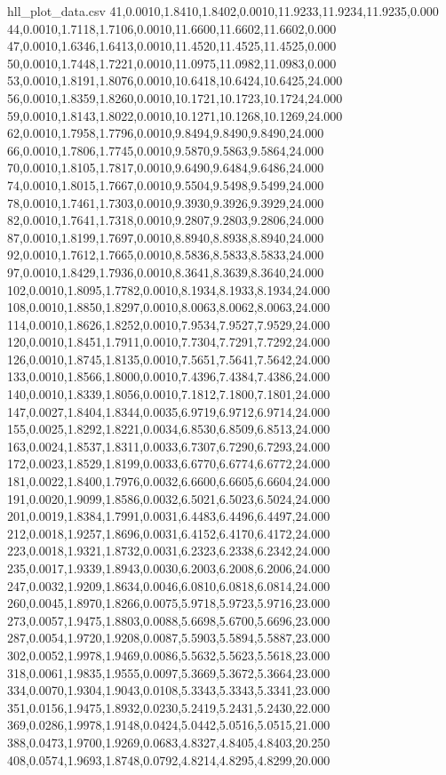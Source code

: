 \documentclass[11pt,letterpaper]{article}
\begin{document}
\begin{filecontents*}{hll_plot_data.csv}
41,0.0010,1.8410,1.8402,0.0010,11.9233,11.9234,11.9235,0.000
44,0.0010,1.7118,1.7106,0.0010,11.6600,11.6602,11.6602,0.000
47,0.0010,1.6346,1.6413,0.0010,11.4520,11.4525,11.4525,0.000
50,0.0010,1.7448,1.7221,0.0010,11.0975,11.0982,11.0983,0.000
53,0.0010,1.8191,1.8076,0.0010,10.6418,10.6424,10.6425,24.000
56,0.0010,1.8359,1.8260,0.0010,10.1721,10.1723,10.1724,24.000
59,0.0010,1.8143,1.8022,0.0010,10.1271,10.1268,10.1269,24.000
62,0.0010,1.7958,1.7796,0.0010,9.8494,9.8490,9.8490,24.000
66,0.0010,1.7806,1.7745,0.0010,9.5870,9.5863,9.5864,24.000
70,0.0010,1.8105,1.7817,0.0010,9.6490,9.6484,9.6486,24.000
74,0.0010,1.8015,1.7667,0.0010,9.5504,9.5498,9.5499,24.000
78,0.0010,1.7461,1.7303,0.0010,9.3930,9.3926,9.3929,24.000
82,0.0010,1.7641,1.7318,0.0010,9.2807,9.2803,9.2806,24.000
87,0.0010,1.8199,1.7697,0.0010,8.8940,8.8938,8.8940,24.000
92,0.0010,1.7612,1.7665,0.0010,8.5836,8.5833,8.5833,24.000
97,0.0010,1.8429,1.7936,0.0010,8.3641,8.3639,8.3640,24.000
102,0.0010,1.8095,1.7782,0.0010,8.1934,8.1933,8.1934,24.000
108,0.0010,1.8850,1.8297,0.0010,8.0063,8.0062,8.0063,24.000
114,0.0010,1.8626,1.8252,0.0010,7.9534,7.9527,7.9529,24.000
120,0.0010,1.8451,1.7911,0.0010,7.7304,7.7291,7.7292,24.000
126,0.0010,1.8745,1.8135,0.0010,7.5651,7.5641,7.5642,24.000
133,0.0010,1.8566,1.8000,0.0010,7.4396,7.4384,7.4386,24.000
140,0.0010,1.8339,1.8056,0.0010,7.1812,7.1800,7.1801,24.000
147,0.0027,1.8404,1.8344,0.0035,6.9719,6.9712,6.9714,24.000
155,0.0025,1.8292,1.8221,0.0034,6.8530,6.8509,6.8513,24.000
163,0.0024,1.8537,1.8311,0.0033,6.7307,6.7290,6.7293,24.000
172,0.0023,1.8529,1.8199,0.0033,6.6770,6.6774,6.6772,24.000
181,0.0022,1.8400,1.7976,0.0032,6.6600,6.6605,6.6604,24.000
191,0.0020,1.9099,1.8586,0.0032,6.5021,6.5023,6.5024,24.000
201,0.0019,1.8384,1.7991,0.0031,6.4483,6.4496,6.4497,24.000
212,0.0018,1.9257,1.8696,0.0031,6.4152,6.4170,6.4172,24.000
223,0.0018,1.9321,1.8732,0.0031,6.2323,6.2338,6.2342,24.000
235,0.0017,1.9339,1.8943,0.0030,6.2003,6.2008,6.2006,24.000
247,0.0032,1.9209,1.8634,0.0046,6.0810,6.0818,6.0814,24.000
260,0.0045,1.8970,1.8266,0.0075,5.9718,5.9723,5.9716,23.000
273,0.0057,1.9475,1.8803,0.0088,5.6698,5.6700,5.6696,23.000
287,0.0054,1.9720,1.9208,0.0087,5.5903,5.5894,5.5887,23.000
302,0.0052,1.9978,1.9469,0.0086,5.5632,5.5623,5.5618,23.000
318,0.0061,1.9835,1.9555,0.0097,5.3669,5.3672,5.3664,23.000
334,0.0070,1.9304,1.9043,0.0108,5.3343,5.3343,5.3341,23.000
351,0.0156,1.9475,1.8932,0.0230,5.2419,5.2431,5.2430,22.000
369,0.0286,1.9978,1.9148,0.0424,5.0442,5.0516,5.0515,21.000
388,0.0473,1.9700,1.9269,0.0683,4.8327,4.8405,4.8403,20.250
408,0.0574,1.9693,1.8748,0.0792,4.8214,4.8295,4.8299,20.000

\end{filecontents*}
\end{document}
